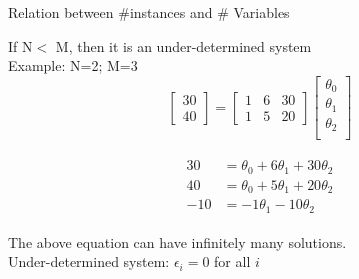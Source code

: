 \documentclass{beamer}
\begin{document}
\begin{frame}{Relation between \#instances and \# Variables}
    
    If N$<$ M, then it is an under-determined system\\
   \pause  Example: N=2; M=3\\
 
   \pause $$ \begin{bmatrix}
        30 \\
        40 
    \end{bmatrix}
     = \begin{bmatrix}
         1 & 6& 30\\
         1 & 5& 20
     \end{bmatrix}    \begin{bmatrix}
        \theta_{0}\\
        \theta_{1}\\
        \theta_{2}\\
    \end{bmatrix} $$
 
    
    
  \pause   \begin{align}
\label{eqn*:eqlabel}
\begin{split}
   30 &= \theta_{0} + 6\theta_{1} + 30\theta_{2} \\
40 &= \theta_{0} + 5\theta_{1} + 20\theta_{2}\\
\hline
-10 &=  -1 \theta_{1} -10\theta_{2}
\end{split}
\end{align}

    
        
        
            
    
    
    
    The above equation can have infinitely many solutions. \\
    Under-determined system: $\epsilon_{i} = 0$ for all $i$

\end{frame}
\end{document}
